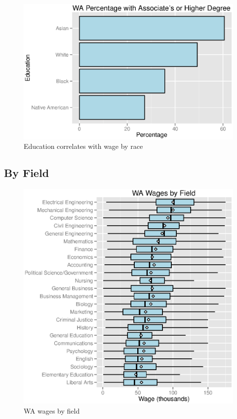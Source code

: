 \documentclass{exam}
\begin{document}
  \begin{figure}[H]
    \centering
    \includegraphics{figures/wa_degree_by_race.eps}
    \caption{Education correlates with wage by race}
  \end{figure}

  \subsection{By Field}
  \begin{figure}[H]
    \centering
    \includegraphics{figures/wa_wage_by_field.eps}
    \caption{WA wages by field}
  \end{figure}
\end{document}
